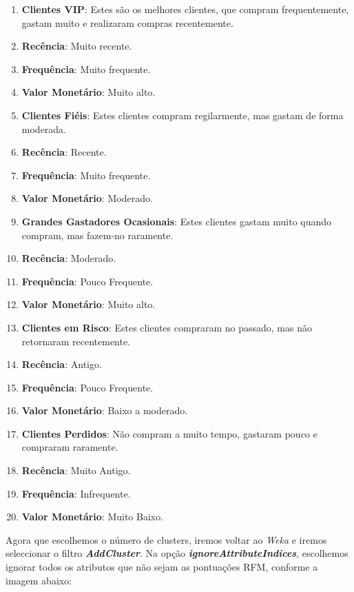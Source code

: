 \documentclass{easychair}
\begin{document}
\begin{enumerate}
    \item \textbf{Clientes VIP}: Estes são os melhores clientes, que compram frequentemente, gastam muito e realizaram compras recentemente.
		\item[\textbullet] \textbf{Recência}: Muito recente.
		\item[\textbullet] \textbf{Frequência}: Muito frequente.
		\item[\textbullet] \textbf{Valor Monetário}: Muito alto.
    \item \textbf{Clientes Fiéis}: Estes clientes compram regilarmente, mas gastam de forma moderada.
		\item[\textbullet] \textbf{Recência}: Recente.
		\item[\textbullet] \textbf{Frequência}: Muito frequente.
		\item[\textbullet] \textbf{Valor Monetário}: Moderado.
    \item \textbf{Grandes Gastadores Ocasionais}: Estes clientes gastam muito quando compram, mas fazem-no raramente.
		\item[\textbullet] \textbf{Recência}: Moderado.
		\item[\textbullet] \textbf{Frequência}: Pouco Frequente.
		\item[\textbullet] \textbf{Valor Monetário}: Muito alto.
    \item \textbf{Clientes em Risco}: Estes clientes compraram no passado, mas não retornaram recentemente.
		\item[\textbullet] \textbf{Recência}: Antigo.
		\item[\textbullet] \textbf{Frequência}: Pouco Frequente.
		\item[\textbullet] \textbf{Valor Monetário}: Baixo a moderado.
    \item \textbf{Clientes Perdidos}: Não compram a muito tempo, gastaram pouco e compraram raramente.
		\item[\textbullet] \textbf{Recência}: Muito Antigo.
		\item[\textbullet] \textbf{Frequência}: Infrequente.
		\item[\textbullet] \textbf{Valor Monetário}: Muito Baixo.
\end{enumerate}

\newpage

Agora que escolhemos o número de clusters, iremos voltar ao \textit{Weka} e iremos seleccionar o filtro \textit{\textbf{AddCluster}}. Na opção \textit{\textbf{ignoreAttributeIndices}}, escolhemos ignorar todos os atributos que não sejam as pontuações RFM, conforme a imagem abaixo:
\end{document}
